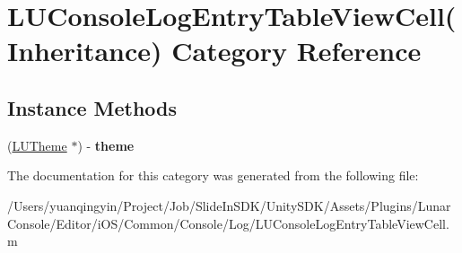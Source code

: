 \hypertarget{category_l_u_console_log_entry_table_view_cell_07_inheritance_08}{}\section{L\+U\+Console\+Log\+Entry\+Table\+View\+Cell(Inheritance) Category Reference}
\label{category_l_u_console_log_entry_table_view_cell_07_inheritance_08}
\subsection*{Instance Methods}
\begin{DoxyCompactItemize}
\item 
\mbox{\label{category_l_u_console_log_entry_table_view_cell_07_inheritance_08_a86edcff33130471941aaba53066ec8f9}} 
(\mbox{\hyperlink{interface_l_u_theme}{L\+U\+Theme}} $\ast$) -\/ {\bfseries theme}
\end{DoxyCompactItemize}


The documentation for this category was generated from the following file\+:\begin{DoxyCompactItemize}
\item 
/\+Users/yuanqingyin/\+Project/\+Job/\+Slide\+In\+S\+D\+K/\+Unity\+S\+D\+K/\+Assets/\+Plugins/\+Lunar\+Console/\+Editor/i\+O\+S/\+Common/\+Console/\+Log/L\+U\+Console\+Log\+Entry\+Table\+View\+Cell.\+m\end{DoxyCompactItemize}
